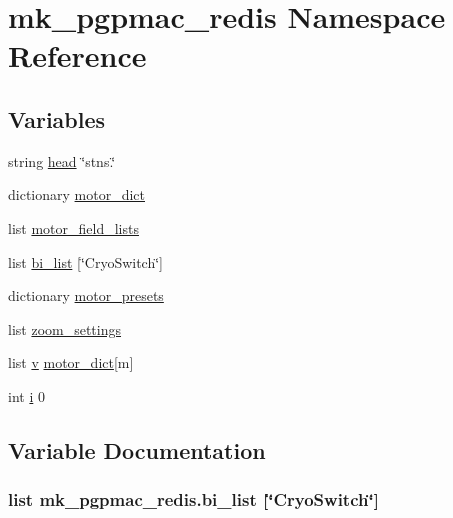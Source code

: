 \hypertarget{namespacemk__pgpmac__redis}{\section{mk\-\_\-pgpmac\-\_\-redis Namespace Reference}
\label{namespacemk__pgpmac__redis}
}
\subsection*{Variables}
\begin{DoxyCompactItemize}
\item 
string \hyperlink{namespacemk__pgpmac__redis_a3a09e1c5bb44c0bb2175c311655d1b15}{head} \char`\"{}stns.\char`\"{}
\item 
dictionary \hyperlink{namespacemk__pgpmac__redis_ad8583d4fe88c4c98af73d2858c51c660}{motor\-\_\-dict}
\item 
list \hyperlink{namespacemk__pgpmac__redis_a7228dc1b6ecec376538db1efe8c05ffb}{motor\-\_\-field\-\_\-lists}
\item 
list \hyperlink{namespacemk__pgpmac__redis_a961bfabfbdcbf5b749f6e6ecdc733619}{bi\-\_\-list} \mbox{[}\char`\"{}Cryo\-Switch\char`\"{}\mbox{]}
\item 
dictionary \hyperlink{namespacemk__pgpmac__redis_a2a04d8d0b7270384d1fac674c29e774a}{motor\-\_\-presets}
\item 
list \hyperlink{namespacemk__pgpmac__redis_ad91bac9be746f99e1cf1f8e28ff348be}{zoom\-\_\-settings}
\item 
list \hyperlink{namespacemk__pgpmac__redis_a5f3a2bd9ec25ae16b9b4af04dabb504c}{v} \hyperlink{namespacemk__pgpmac__redis_ad8583d4fe88c4c98af73d2858c51c660}{motor\-\_\-dict}\mbox{[}m\mbox{]}
\item 
int \hyperlink{namespacemk__pgpmac__redis_afa643a23a5984fe44c2182ada3dfa401}{i} 0
\end{DoxyCompactItemize}


\subsection{Variable Documentation}
\hypertarget{namespacemk__pgpmac__redis_a961bfabfbdcbf5b749f6e6ecdc733619}{
\subsubsection[{bi\-\_\-list}]{\setlength{\rightskip}{0pt plus 5cm}list mk\-\_\-pgpmac\-\_\-redis.\-bi\-\_\-list \mbox{[}\char`\"{}Cryo\-Switch\char`\"{}\mbox{]}}}\label{namespacemk__pgpmac__redis_a961bfabfbdcbf5b749f6e6ecdc733619}


